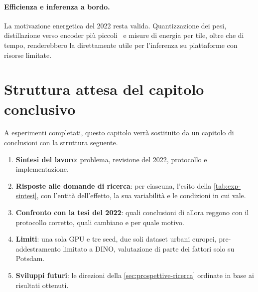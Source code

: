 \paragraph{Efficienza e inferenza a bordo.}
La motivazione energetica del 2022 resta valida. Quantizzazione dei pesi, distillazione verso
encoder più piccoli~\cite{hinton2015distilling} e misure di energia per tile, oltre che di
tempo, renderebbero la  direttamente utile per l'inferenza su piattaforme con risorse
limitate.

\section{Struttura attesa del capitolo conclusivo}
\label{sec:struttura-conclusioni}

A esperimenti completati, questo capitolo verrà sostituito da un capitolo di conclusioni con la
struttura seguente.

\begin{enumerate}
  \item \textbf{Sintesi del lavoro}: problema, revisione del 2022, protocollo e implementazione.
  \item \textbf{Risposte alle domande di ricerca}: per ciascuna, l'esito della
  \cref{tab:exp-sintesi}, con l'entità dell'effetto, la sua variabilità e le condizioni in cui
  vale.
  \item \textbf{Confronto con la tesi del 2022}: quali conclusioni di allora reggono con il
  protocollo corretto, quali cambiano e per quale motivo.
  \item \textbf{Limiti}: una sola GPU e tre seed, due soli dataset urbani europei, pre-addestramento
  limitato a DINO, valutazione di parte dei fattori solo su Potsdam.
  \item \textbf{Sviluppi futuri}: le direzioni della \cref{sec:prospettive-ricerca} ordinate in
  base ai risultati ottenuti.
\end{enumerate}

